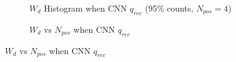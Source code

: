 \begin{figure}[H]
\begin{minipage}[t]{.5\textwidth}
\begin{figure}[H]
    \centering
    \resizebox{\textwidth}{!}{}
    \caption{\label{fig:cnn-hist} $W_{d}$ Histogram when CNN $q_{rec}$ (95\% counts, $N_{pos}=4$)}
\end{figure}
\end{minipage}
\begin{minipage}[t]{.5\textwidth}
\begin{figure}[H]
    \centering
    \resizebox{\textwidth}{!}{}
    \caption{\label{fig:cnn-npos}$W_{d}$ vs $N_{pos}$ when CNN $q_{rec}$}
\end{figure}
\end{minipage}
\end{figure}

